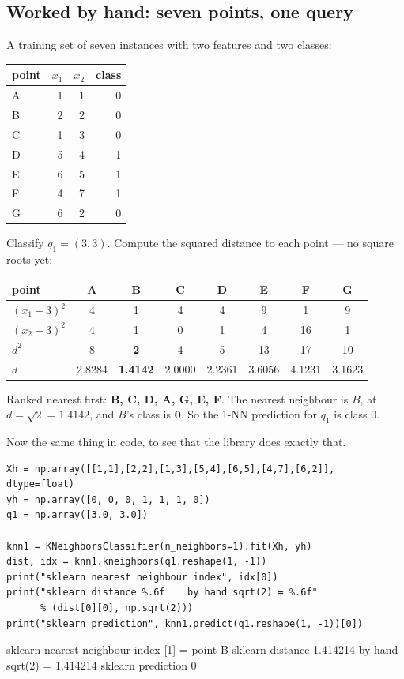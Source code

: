 \documentclass[11pt]{article}
\begin{document}
\subsection{Worked by hand: seven points, one query}
\label{sec:hand}

\begin{worked}
A training set of seven instances with two features and two classes:

\begin{center}\small
\begin{tabular}{@{}lrrr@{}}
\toprule
point & $x_1$ & $x_2$ & class\\
\midrule
A & 1 & 1 & 0\\
B & 2 & 2 & 0\\
C & 1 & 3 & 0\\
D & 5 & 4 & 1\\
E & 6 & 5 & 1\\
F & 4 & 7 & 1\\
G & 6 & 2 & 0\\
\bottomrule
\end{tabular}
\end{center}

Classify $q_1 = (3, 3)$. Compute the squared distance to each point --- no
square roots yet:

\begin{center}\small
\begin{tabular}{@{}lccccccc@{}}
\toprule
point & A & B & C & D & E & F & G\\
\midrule
$(x_1-3)^2$ & 4 & 1 & 4 & 4 & 9 & 1 & 9\\
$(x_2-3)^2$ & 4 & 1 & 0 & 1 & 4 & 16 & 1\\
\midrule
$d^2$ & 8 & \textbf{2} & 4 & 5 & 13 & 17 & 10\\
$d$ & 2.8284 & \textbf{1.4142} & 2.0000 & 2.2361 & 3.6056 & 4.1231 & 3.1623\\
\bottomrule
\end{tabular}
\end{center}

Ranked nearest first: \textbf{B, C, D, A, G, E, F}. The nearest neighbour is
$B$, at $d = \sqrt{2} = 1.4142$, and $B$'s class is $\mathbf{0}$. So the 1-NN
prediction for $q_1$ is class $0$.
\end{worked}

Now the same thing in code, to see that the library does exactly that.

\begin{lstlisting}
Xh = np.array([[1,1],[2,2],[1,3],[5,4],[6,5],[4,7],[6,2]], dtype=float)
yh = np.array([0, 0, 0, 1, 1, 1, 0])
q1 = np.array([3.0, 3.0])

knn1 = KNeighborsClassifier(n_neighbors=1).fit(Xh, yh)
dist, idx = knn1.kneighbors(q1.reshape(1, -1))
print("sklearn nearest neighbour index", idx[0])
print("sklearn distance %.6f    by hand sqrt(2) = %.6f"
      % (dist[0][0], np.sqrt(2)))
print("sklearn prediction", knn1.predict(q1.reshape(1, -1))[0])
\end{lstlisting}
\begin{codeout}
sklearn nearest neighbour index [1] = point B
sklearn distance 1.414214    by hand sqrt(2) = 1.414214
sklearn prediction 0
\end{codeout}
\end{document}
